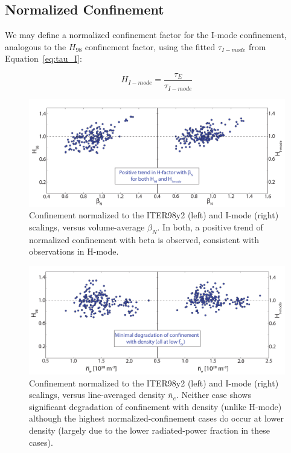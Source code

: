 \documentclass[12pt]{iopart}
\begin{document}
\subsection{Normalized Confinement}\label{subsec:norm}

We may define a normalized confinement factor for the I-mode confinement, analogous to the $H_{98}$ confinement factor, using the fitted $\tau_{I-mode}$ from Equation~\ref{eq:tau_I}:

\begin{equation}
 H_{I-mode} = \frac{\tau_E}{\tau_{I-mode}}
\end{equation}

\begin{figure}[ht]
 \includegraphics[width=\textwidth]{betaN_H.pdf}
 \caption{Confinement normalized to the ITER98y2 (left) and I-mode (right) scalings, versus volume-average $\beta_N$.  In both, a positive trend of normalized confinement with beta is observed, consistent with observations in H-mode.}
 \label{fig:betaN_H}
\end{figure}

\begin{figure}[ht]
 \includegraphics[width=\textwidth]{nebar_H.pdf}
 \caption{Confinement normalized to the ITER98y2 (left) and I-mode (right) scalings, versus line-averaged density $\overline{n}_e$.  Neither case shows significant degradation of confinement with density (unlike H-mode) although the highest normalized-confinement cases do occur at lower density (largely due to the lower radiated-power fraction in these cases).}
 \label{fig:nebar_H}
\end{figure}
\end{document}
